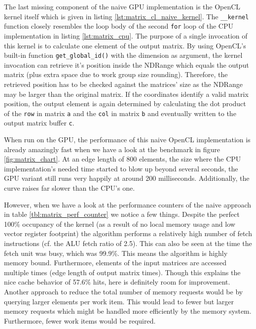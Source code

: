 

The last missing component of the naive GPU implementation is the OpenCL kernel itself which is given in listing \ref{lst:matrix_cl_naive_kernel}. The \lstinline!__kernel! function closely resembles the loop body of the second \lstinline!for! loop of the CPU implementation in listing \ref{lst:matrix_cpu}. The purpose of a single invocation of this kernel is to calculate one element of the output matrix. By using OpenCL's built-in function \lstinline!get_global_id()! with the dimension as argument, the kernel invocation can retrieve it's position inside the NDRange which equals the output matrix (plus extra space due to work group size rounding). Therefore, the retrieved position has to be checked against the matrices' size as the NDRange may be larger than the original matrix. If the coordinates identify a valid matrix position, the output element is again determined by calculating the dot product of the \lstinline!row! in matrix \lstinline!a! and the \lstinline!col! in matrix \lstinline!b! and eventually written to the output matrix buffer \lstinline!c!.



When run on the GPU, the performance of this naive OpenCL implementation is already amazingly fast when we have a look at the benchmark in figure \ref{fig:matrix_chart}. At an edge length of 800 elements, the size where the CPU implementation's needed time started to blow up beyond several seconds, the GPU variant still runs very happily at around 200 milliseconds. Additionally, the curve raises far slower than the CPU's one.

However, when we have a look at the performance counters of the naive approach in table \ref{tbl:matrix_perf_counter} we notice a few things. Despite the perfect 100\% occupancy of the kernel (as a result of no local memory usage and low vector register footprint) the algorithm performs a relatively high number of fetch instructions (cf. the ALU fetch ratio of 2.5). This can also be seen at the time the fetch unit was busy, which was 99.9\%. This means the algorithm is highly memory bound. Furthermore, elements of the input matrices are accessed multiple times (edge length of output matrix times). Though this explains the nice cache behavior of 57.6\% hits, here is definitely room for improvement.
Another approach to reduce the total number of memory requests would be by querying larger elements per work item. This would lead to fewer but larger memory requests which might be handled more efficiently by the memory system. Furthermore, fewer work items would be required.

